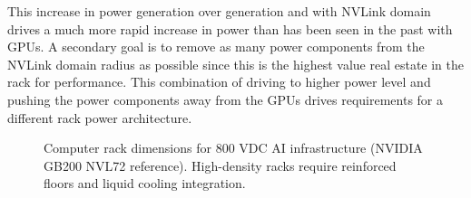 This increase in power generation over generation and with NVLink domain drives a much more rapid increase in power than has been seen in the past with GPUs. A secondary goal is to remove as many power components from the NVLink domain radius as possible since this is the highest value real estate in the rack for performance. This combination of driving to higher power level and pushing the power components away from the GPUs drives requirements for a different rack power architecture.

\begin{figure}[h]
\centering
{}
\caption{Computer rack dimensions for 800 VDC AI infrastructure (NVIDIA GB200 NVL72 reference). High-density racks require reinforced floors and liquid cooling integration.}
\label{fig:rack-dimensions}
\end{figure}

